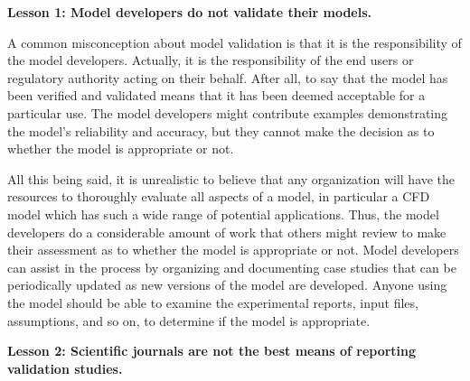 \documentclass[fleqn,b5paper]{article}
\begin{document}
\vspace{\parskip}
{\bf Lesson 1: Model developers do not validate their models.}

A common misconception about model validation is that it is the responsibility of the model developers. Actually, it is the responsibility of the end users or regulatory authority acting on their behalf. After all, to say that the model has been verified and validated means that it has been deemed acceptable for a particular use. The model developers might contribute examples demonstrating the model's reliability and accuracy, but they cannot make the decision as to whether the model is appropriate or not.

All this being said, it is unrealistic to believe that any organization will have the resources to thoroughly evaluate all aspects of a model, in particular a CFD model which has such a wide range of potential applications. Thus, the model developers do a considerable amount of work that others might review to make their assessment as to whether the model is appropriate or not. Model developers can assist in the process by organizing and documenting case studies that can be periodically updated as new versions of the model are developed. Anyone using the model should be able to examine the experimental reports, input files, assumptions, and so on, to determine if the model is appropriate.




\vspace{\parskip}
{\bf Lesson 2: Scientific journals are not the best means of reporting validation studies.}
\end{document}
